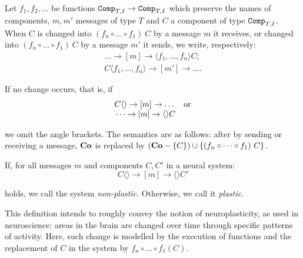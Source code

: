 \begin{definition}
	Let $f_1,f_2,\dots$ be functions $\texttt{Comp}_{T,I} \rightarrow \texttt{Comp}_{T,I}$ which preserve the names of components, $m,m'$ messages of type $T$ and $C$ a component of type $\texttt{Comp}_{T,I}$. When $C$ is changed into $(f_n \circ \dots \circ f_1)\ C$ by a message $m$ it receives, or changed into $(f_n \circ \dots \circ f_1)\ C$ by a message $m'$ it sends, we write, respectively:
	$$
	\begin{array}{c}
	\dots \rightarrow [m] \rightarrow \langle f_1,\dots,f_n \rangle C;\\
	C\langle f_1,\dots,f_n \rangle \rightarrow [m'] \rightarrow \dots.
	\end{array}
	$$
	
	\noindent
	If no change occurs, that is, if
	$$
	\begin{array}{r l}
	C\langle\rangle \rightarrow [m] \rightarrow \dots & \textnormal{or}\\
	\dots \rightarrow [m] \rightarrow \langle\rangle C
	\end{array}
	$$
	
	\noindent
	we omit the angle brackets.
	The semantics are as follows: after by sending or receiving a message, $\mathbf{Co}$ is replaced by $(\mathbf{Co} - \{C\}) \cup \{(f_n \circ \dots \circ f_1)\ C \}$.
\end{definition}

\begin{definition}
	If, for all messages $m$ and components $C, C'$ in a neural system:
	$$
	C\langle\rangle \rightarrow [m] \rightarrow \langle\rangle C'
	$$
	
	\noindent
	holds, we call the system \emph{non-plastic}. Otherwise, we call it \emph{plastic}.
\end{definition}


This definition intends to roughly convey the notion of neuroplasticity, as used in neuroscience: areas in the brain are changed over time through specific patterns of activity. Here, such change is modelled by the execution of functions and the replacement of $C$ in the system by $f_n \circ \dots \circ f_1 (C)$.

